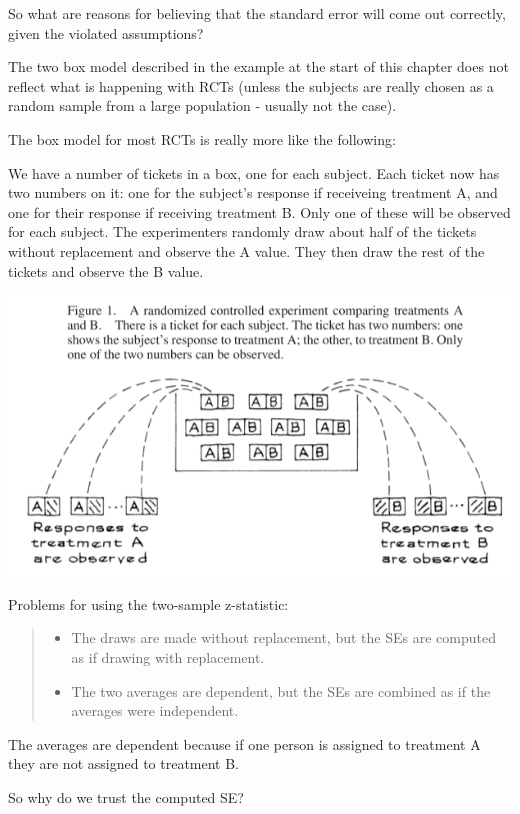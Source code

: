\documentclass[
]{book}
\providecommand{\tightlist}{%
  \setlength{\itemsep}{0pt}\setlength{\parskip}{0pt}}
\begin{document}
So what are reasons for believing that the standard error will come out correctly, given the violated assumptions?

The two box model described in the example at the start of this chapter does not reflect what is happening with RCTs (unless the subjects are really chosen as a random sample from a large population - usually not the case).

The box model for most RCTs is really more like the following:

We have a number of tickets in a box, one for each subject. Each ticket now has two numbers on it: one for the subject's response if receiveing treatment A, and one for their response if receiving treatment B. Only one of these will be observed for each subject. The experimenters randomly draw about half of the tickets without replacement and observe the A value. They then draw the rest of the tickets and observe the B value.

\includegraphics{images/Ch27Img01.png}

Problems for using the two-sample z-statistic:

\begin{quote}
\begin{itemize}
\tightlist
\item
  The draws are made without replacement, but the SEs are computed as if drawing with replacement.
\item
  The two averages are dependent, but the SEs are combined as if the averages were independent.
\end{itemize}
\end{quote}

The averages are dependent because if one person is assigned to treatment A they are not assigned to treatment B.

So why do we trust the computed SE?
\end{document}
